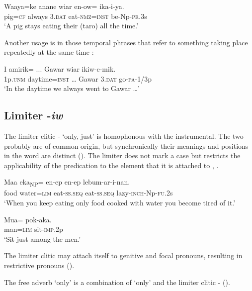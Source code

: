 \ea%
\label{ex:3:x774}
\gll Waaya=ke anane wiar en-ow= ika-i-ya. \\
pig=\textsc{cf} always 3.\textsc{dat} eat-\textsc{nmz}=\textsc{inst} be-Np-\textsc{pr}.3s\\
\glt`A pig stays eating their (taro) all the time.'
\z

Another usage is in those temporal phrases that refer to something taking place repeatedly at the same time : 

\ea%
\label{ex:3:x1882}
\gll I amirik= ... Gawar wiar ikiw-e-mik. \\
1p.\textsc{unm} daytime=\textsc{inst} {\dots} Gawar 3.\textsc{dat} go-\textsc{pa}-1/3p\\
\glt`In the daytime we always went to Gawar {\dots}'
\z

\subsection{Limiter -\textit{iw}}\label{sec:3.12.6}
{}
The limiter clitic - `only, just' is homophonous with the instrumental. The two probably are of common origin, but synchronically their meanings and positions in the word are distinct (). The limiter does not mark a case but restricts the applicability of the predication to the element that it is attached to , . 

\ea%
\label{ex:3:x769}
\gll {\ob}Maa eka{\cb}\textsubscript{NP}= en-ep en-ep lebum-ar-i-nan. \\
food water=\textsc{lim} eat-\textsc{ss}.\textsc{seq} eat-\textsc{ss}.\textsc{seq} lazy-\textsc{inch}-Np-\textsc{fu}.2s\\
\glt`When you keep eating only food cooked with water you become tired of it.'
\z

\ea%
\label{ex:3:x772}
\gll Mua= pok-aka. \\
man=\textsc{lim} sit-\textsc{imp}.2p\\
\glt`Sit just among the men.'
\z

The limiter clitic may attach itself to genitive and focal pronouns, resulting in restrictive pronouns  (). 

The free adverb  `only' is a combination of  `only' and the limiter clitic -  ().

